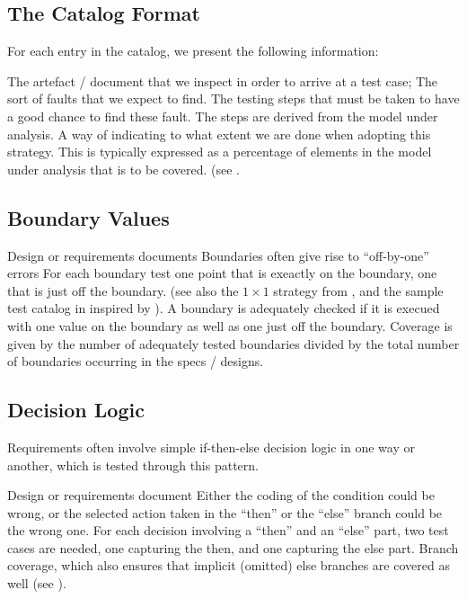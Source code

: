 \documentclass{article}
\begin{document}
\subsection{The Catalog Format}

For each entry in the catalog, we present the following information:
\begin{itemize}
\model 
  The artefact / document that we inspect in order
  to arrive at a test case;
\faults 
  The sort of faults that we expect to find.
\strategy
  The testing steps that must be taken to have a good chance
  to find these fault. The steps are derived from the model under analysis.
\adequacy
  A way of indicating to what extent we are done when adopting
  this strategy. This is typically expressed as a percentage of elements
  in the model under analysis that is to be covered. 
  (see \cite[Chapter 9]{Pezze:2008}.
\end{itemize}

\subsection{Boundary Values}

\begin{itemize}
\model 
  Design or requirements documents
\faults 
  Boundaries often give rise to ``off-by-one'' errors
\strategy 
  For each boundary test one point that is exeactly on the
  boundary, one that is just off the boundary. 
  (see also the $1\times1$ strategy from \cite{Binder:2000},
  and the sample test catalog in \cite[Table 11.7]{Pezze:2008}
  inspired by \cite{Marick:1995}).
\adequacy
  A boundary is adequately checked if it is execued with one value
  on the boundary as well as one just off the boundary.
  Coverage is given by the number of adequately tested boundaries
  divided by the total number of boundaries occurring in the 
  specs / designs.
\end{itemize}

 
\subsection{Decision Logic}

\label{basic-logic}
Requirements often involve simple if-then-else decision logic 
in one way or another, which is tested through this pattern.
\begin{itemize}
\model 
  Design or requirements document
\faults
  Either the coding of the condition could be wrong, 
  or the selected action taken in the
  ``then'' or the ``else'' branch could be the wrong one.
\strategy
  For each decision involving a ``then'' and an ``else'' part,
  two test cases are needed, one capturing the then, and one capturing
  the else part.
\adequacy
  Branch coverage, which also ensures that implicit (omitted) 
  else branches are covered as well
  (see \cite[Section 12.3]{Pezze:2008}).
\end{itemize}
\end{document}
